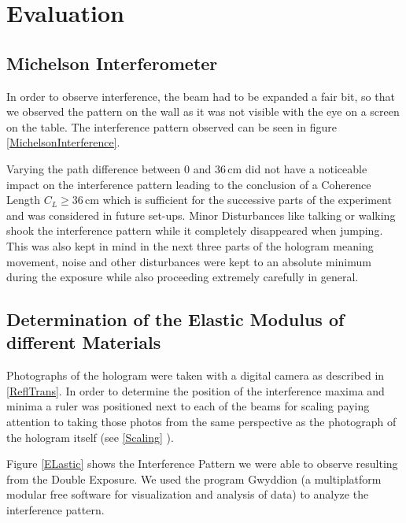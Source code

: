 \section{Evaluation}

\subsection{Michelson Interferometer}

In order to observe interference, the beam had to be expanded a fair bit, so that we observed the pattern on the wall as it was not visible with the eye on a screen on the table. The interference pattern observed can be seen in figure \ref{MichelsonInterference}.


Varying the path difference between $0$ and $36\,\mathrm{cm}$ did not have a noticeable impact on the interference pattern leading to the conclusion of a Coherence Length $C_L \geq 36\,\mathrm{cm}$ which is sufficient for the successive parts of the experiment and was considered in future set-ups. Minor Disturbances like talking or walking shook the interference pattern while it completely disappeared when jumping. This was also kept in mind in the next three parts of the hologram meaning movement, noise and other disturbances were kept to an absolute minimum during the exposure while also proceeding extremely carefully in general. 

\subsection{Determination of the Elastic Modulus of different Materials}

Photographs of the hologram were taken with a digital camera as described in \ref{ReflTrans}. In order to determine the position of the interference maxima and minima a ruler was positioned next to each of the beams for scaling paying attention to taking those photos from the same perspective as the photograph of the hologram itself (see \ref{Scaling} ).



Figure \ref{ELastic} shows the Interference Pattern we were able to observe resulting from the Double Exposure. We used the program Gwyddion (a multiplatform modular free software for visualization and analysis of data) to analyze the interference pattern.  

